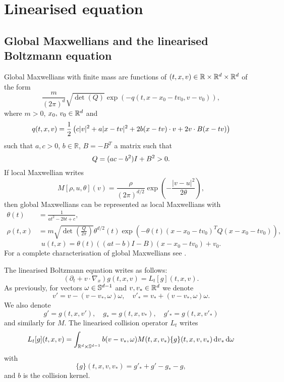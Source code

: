 \section{Linearised equation} %
\label{sec:linearised_equation}
 \subsection{Global Maxwellians and the linearised Boltzmann equation} %
 \label{ssec:global_maxwellians}
 
Global Maxwellians with finite mass are functions of $(t,x,v)\in {\mathbb R}\times{{\mathbb R^d}\times{\mathbb R^d}}$ of the form
\begin{equation}
	\frac{m}{(2\pi)^{d}}\sqrt{\det(Q)}\exp(-q(t,x-x_0-tv_0,v-v_0)),
	\label{levermore}
\end{equation}
where $m>0$, $x_0,\,v_0\in {\mathbb R^d}$ and \begin{equation}
	\notag
	q(t,x,v)=\frac{1}{2}\left(c|v|^2+a|x-tv|^2+2b(x-tv)\cdot v+2v\cdot B(x-tv)\right)
\end{equation}
such that $a,c>0$, $b\in \mathbb R$, $B=-B^T$ a matrix such that \begin{equation}
	\notag
Q=(ac-b^2)I+B^2>0.	
\end{equation}
If local Maxwellian writes 
\[M[\rho,u,\theta](v)=\frac{\rho}{(2 \pi)^{d/2}}\exp\left(-\frac{|v-u|^2}{2 \theta}\right),\]
then global Maxwellians can be represented as local Maxwellians with
 \begin{equation}\label{eq:locals}
 	\begin{aligned}
 		\theta(t)&=\frac{1}{ at^2-2bt+c },\\ \rho(t,x)&=m \sqrt{\det\left(\frac{Q}{2 \pi}\right)}\theta^{d/2}(t)\exp(-\theta(t)(x-x_0-tv_0)^{T}Q(x-x_0-tv_0)),
 	\end{aligned}
 \end{equation}
\[u(t,x)=\theta(t)\left((a t-b)I -B\right)(x-x_0-tv_0)+v_0.\]
For a complete characterisation of global Maxwellians see \cite{CDL-GlM}.

The linearised Boltzmann equation writes as follows:
\begin{equation}\label{eq:theone}
	(\partial_t + v\cdot \nabla_x)g(t,x,v)=L_t[g](t,x,v).
\end{equation}
As previously, for vectors $\omega\in{\mathbb S^{d-1}} $ and $v,v_*\in{\mathbb R^d}$ we denote
\[v'=v-(v-v_*,\omega)\omega,\quad v'_*=v_*+(v-v_*,\omega)\omega.\]
We also denote \[g'=g(t,x,v'),\quad g_*=g(t,x,v_*),\quad g'_*=g(t,x,v'_*)\]
and similarly for $M$.
 The linearised collision operator $L_t$ writes  
\[L_t[g](t,x,v) = \int_{{\mathbb R^d}\times{\mathbb S^{d-1}}}b(v-v_*,\omega)M(t,x,v_*)\{g\}(t,x,v,v_*){\,\mathrm{d} v}_*{\,\mathrm{d} \omega}\]
with \[\{g\}(t,x,v,v_*) = g'_*+g'- g_*-g,  \]
and $b$ is the collision kernel.

